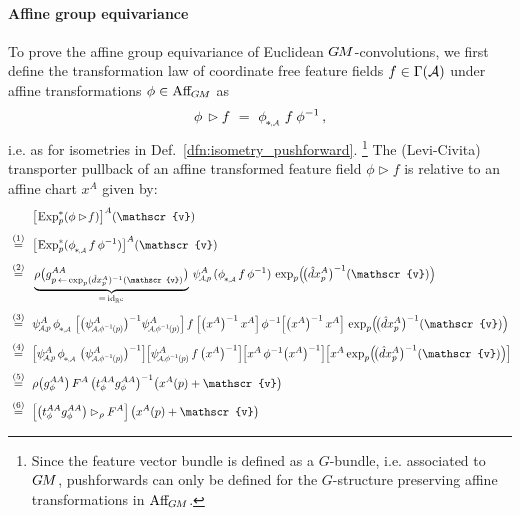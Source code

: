 \paragraph{Affine group equivariance}

To prove the affine group equivariance of Euclidean $G\mkern-1.4muM$-convolutions, we first define the transformation law of coordinate free feature fields $f\in \Gamma(\mathcal{A})$ under affine transformations $\phi \in \operatorname{Aff}_{\mkern-2muG\mkern-1.4muM}$ as
\begin{align}\label{eq:affine_action_sections}
    \phi \,\rhd f\ =\ \dphiA\, f\: \phi^{-1} \,,
\end{align}
i.e. as for isometries in Def.~\ref{dfn:isometry_pushforward}.%
\footnote{
    Since the feature vector bundle is defined as a $G$-bundle, i.e. associated to $G\mkern-1.4muM$, pushforwards can only be defined for the $G$-structure preserving affine transformations in $\operatorname{Aff}_{\mkern-2muG\mkern-1.4muM}$.
}
The (Levi-Civita) transporter pullback of an affine transformed feature field $\phi \rhd\! f$ is relative to an affine chart $x^A$ given by:
\begin{align}\label{eq:affine_transformed_transporter_pullback}
    &\ \ 
        \big[\mkern-2mu \Expsp (\phi \rhd\! f) \big]^A (\mathscr{v})
    \notag \\[.8ex]
    \ \overset{(1)}{=}&\ \ 
        \big[\mkern-2mu \Expsp (\dphiA f\, \phi^{-1}) \big]^A (\mathscr{v})
    \notag \\[.8ex]
    \ \overset{(2)}{=}&\ \ 
        \underbrace{\rho\big( g^{AA}_{p \,\leftarrow\, \exp_p (\hat{d}x_p^A)^{-1}(\mathscr{v})} \big)}_{=\, \id_{\R^c}} \,
        \psiAp^A\, (\dphiA f\, \phi^{-1})\,
        \exp_p \!\pig(\! \big(\hat{d}x_p^A \big)^{-1}(\mathscr{v}) \pig)
    \notag \\[.8ex]
    \ \overset{(3)}{=}&\ \ 
        \psiAp^A\, \dphiA\,
        \pig[ \big( \psiAphiinvp^A \big)^{-1} \psiAphiinvp^A\pig]\, 
        f\: 
        \pig[ \big(x^A \big)^{-1}\, x^A\pig]\, 
        \phi^{-1} 
        \pig[ \big(x^A \big)^{-1}\, x^A\pig]\, 
        \exp_p \!\pig(\! \big(\hat{d}x_p^A \big)^{-1}(\mathscr{v}) \pig)
    \notag \\[.8ex]
    \ \overset{(4)}{=}&\ \ 
        \pig[\psiAp^A\, \dphiA\, \big(\psiAphiinvp^A \big)^{-1}\pig]
        \pig[\psiAphiinvp^A\, f\, \big(x^A \big)^{-1}\pig]
        \pig[x^A\, \phi^{-1} \big(x^A \big)^{-1}\pig]
        \pig[x^A \exp_p \!\pig(\! \big(\hat{d}x_p^A \big)^{-1}(\mathscr{v}) \pig) \pig]
    \notag \\[.8ex]
    \ \overset{(5)}{=}&\ \ 
        \rho\big( g_\phi^{AA} \big)\, F^A\, \big( t_\phi^{AA} g_\phi^{AA} \big)^{-1} \big(x^A(p) + \mathscr{v} \big)
    \notag \\[.8ex]
    \ \overset{(6)}{=}&\ \ 
         \pig[\big( t_\phi^{AA} g_\phi^{AA} \big) \rhd_\rho F^A \pig]\, \big(x^A(p) + \mathscr{v} \big)
\end{align}
